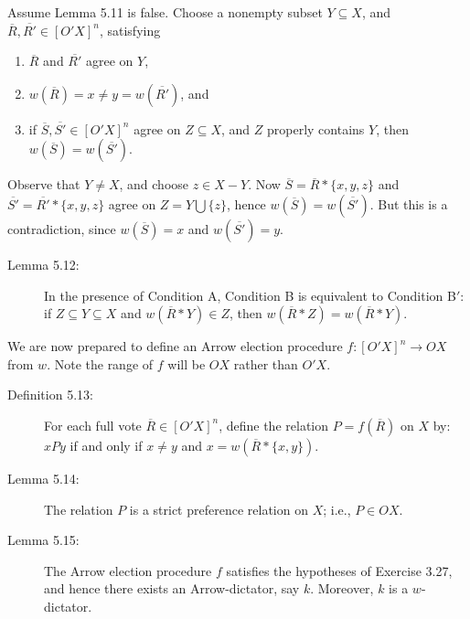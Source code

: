\documentclass{article}
\begin{document}
Assume Lemma 5.11 is false. Choose a nonempty subset $Y \subseteq X$, and $\overline{R}, \overline{R'} \in [O'X]^{n}$, satisfying 
\begin{enumerate}[\hspace{1cm}(a)]
  \item $\overline{R}$ and $\overline{R'}$ agree on $Y$, 
  \item $w(\overline{R}) = x \neq y = w(\overline{R'})$, and 
  \item if $\overline{S}, \overline{S'} \in [O'X]^{n}$ agree on $Z \subseteq X$, and $Z$ properly contains $Y$, then $w(\overline{S}) = w(\overline{S'})$. 
\end{enumerate}
Observe that $Y \neq X$, and choose $z \in X-Y$. Now $\overline{S} = \overline{R}* \{ x,y,z \}$ and $\overline{S'} = \overline{R'}* \{ x,y,z \}$ agree on $Z = Y \bigcup \{ z \}$, hence $w(\overline{S}) = w(\overline{S'})$. But this is a contradiction, since $w(\overline{S}) = x$ and $w(\overline{S'}) = y$.

\begin{description}

\item[Lemma 5.12:] In the presence of Condition A, Condition B is equivalent to Condition B$'$: if $Z \subseteq Y \subseteq X$ and $w(\overline{R}*Y) \in Z$, then $w(\overline{R}*Z) = w(\overline{R}*Y)$.

\end{description}

We are now prepared to define an Arrow election procedure $f:[O'X]^{n} \rightarrow OX$ from $w$. Note the range of $f$ will be $OX$ rather than $O'X$.

\begin{description}

\item[Definition 5.13:] For each full vote $\overline{R} \in [O'X]^{n}$, define the relation $P = f(\overline{R})$ on $X$ by: $xPy$ if and only if $x \neq y$ and $x = w(\overline{R}* \{ x,y \} )$.

\item[Lemma 5.14:] The relation $P$ is a strict preference relation on $X$; i.e., $P \in OX$.

\item[Lemma 5.15:] The Arrow election procedure $f$ satisfies the hypotheses of Exercise 3.27, and hence there exists an Arrow-dictator, say $k$. Moreover, $k$ is a $w$-dictator.

\end{description}
\end{document}
